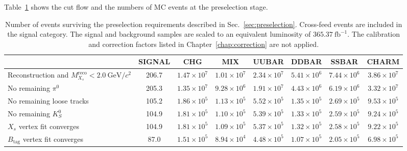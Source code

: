 Table~\ref{tab:preselection_cutflow} shows the cut flow and the numbers of MC events at the preselection stage.
\begin{table}
\caption{
        Number of events surviving the preselection requirements described
        in Sec.~\ref{sec:preselection}.
        Cross-feed events are included in the signal category.
        The signal and background samples are scaled to an equivalent
        luminosity of $365.37~\textrm{fb}^{-1}$.
        The calibration and correction factors listed in
        Chapter~\ref{chap:correction} are not applied.
    }
    \centering
    \renewcommand{\arraystretch}{1.25}
    \setlength{\tabcolsep}{5pt}

    \begin{tabularx}{0.98\textheight}{
        >{\raggedright\arraybackslash}X ||
        c | c | c | c | c | c | c
    }
        \hline
        \hline

        \multicolumn{1}{c||}{Selection}
        & SIGNAL
        & CHG
        & MIX
        & UUBAR
        & DDBAR
        & SSBAR
        & CHARM \\
        \hline

        Reconstruction and $M_{X_{s}}^{\textrm{reco}}<2.0~\textrm{GeV}/c^{2}$
        & 206.7
        & $1.47\times10^{7}$
        & $1.01\times10^{7}$
        & $2.34\times10^{7}$
        & $5.41\times10^{6}$
        & $7.44\times10^{6}$
        & $3.86\times10^{7}$ \\

        No remaining $\pi^{0}$
        & 205.3
        & $1.35\times10^{7}$
        & $9.28\times10^{6}$
        & $1.91\times10^{7}$
        & $4.43\times10^{6}$
        & $6.19\times10^{6}$
        & $3.32\times10^{7}$ \\

        No remaining loose tracks
        & 105.2
        & $1.86\times10^{5}$
        & $1.13\times10^{5}$
        & $5.52\times10^{5}$
        & $1.35\times10^{5}$
        & $2.69\times10^{5}$
        & $9.53\times10^{5}$ \\

        No remaining $K_{S}^{0}$
        & 104.9
        & $1.81\times10^{5}$
        & $1.10\times10^{5}$
        & $5.39\times10^{5}$
        & $1.33\times10^{5}$
        & $2.59\times10^{5}$
        & $9.24\times10^{5}$ \\

        $X_{s}$ vertex fit converges
        & 104.9
        & $1.81\times10^{5}$
        & $1.09\times10^{5}$
        & $5.37\times10^{5}$
        & $1.32\times10^{5}$
        & $2.58\times10^{5}$
        & $9.22\times10^{5}$ \\

        $B_{\textrm{tag}}$ vertex fit converges
        & 87.0
        & $1.51\times10^{5}$
        & $8.94\times10^{4}$
        & $4.48\times10^{5}$
        & $1.07\times10^{5}$
        & $2.05\times10^{5}$
        & $6.98\times10^{5}$ \\

        \hline
        \hline
    \end{tabularx}
    \label{tab:preselection_cutflow}
\end{table}

